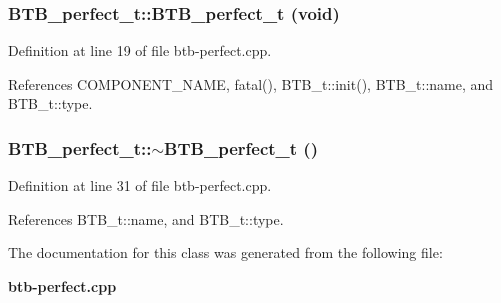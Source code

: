 \subsubsection[{BTB\_\-perfect\_\-t}]{\setlength{\rightskip}{0pt plus 5cm}BTB\_\-perfect\_\-t::BTB\_\-perfect\_\-t (void)\hspace{0.3cm}{\tt  [inline]}}\label{classBTB__perfect__t_11a32c18c0c150bf6d1a12bf7f93eaac}




Definition at line 19 of file btb-perfect.cpp.

References COMPONENT\_\-NAME, fatal(), BTB\_\-t::init(), BTB\_\-t::name, and BTB\_\-t::type.
\subsubsection[{$\sim$BTB\_\-perfect\_\-t}]{\setlength{\rightskip}{0pt plus 5cm}BTB\_\-perfect\_\-t::$\sim$BTB\_\-perfect\_\-t ()\hspace{0.3cm}{\tt  [inline]}}\label{classBTB__perfect__t_ff886da7527d72b2995682e12ce315d3}




Definition at line 31 of file btb-perfect.cpp.

References BTB\_\-t::name, and BTB\_\-t::type.

The documentation for this class was generated from the following file:\begin{CompactItemize}
\item 
{\bf btb-perfect.cpp}\end{CompactItemize}
